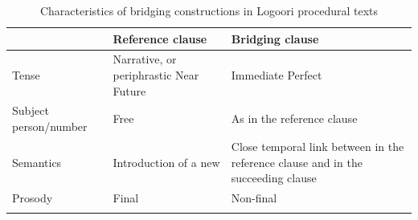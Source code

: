 \documentclass[output=paper]{LSP/langsci}
\begin{document}


\begin{table}
\small
\caption{Characteristics of bridging constructions in Logoori procedural texts}
\label{SaTabl1}
\begin{tabularx}{\textwidth}{lQQ}
\lsptoprule
 & {Reference clause} & {Bridging clause}       \\
\midrule
{Tense}     & Narrative, or  periphrastic Near Future           & Immediate Perfect              \\ \tablevspace 
{Subject person\slash number}      & Free                      & As in the reference clause     \\ \tablevspace                 
{Semantics} &    	Introduction of a new   & Close temporal link between  in the reference clause and  in the succeeding clause\\\tablevspace
{Prosody}                    & Final                     & Non-final                      \\
\lspbottomrule
\end{tabularx}
\end{table}
\end{document}
